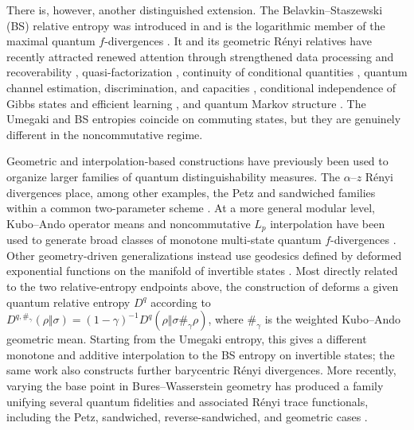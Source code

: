 \documentclass[11pt]{article}
\theoremstyle{remark}
\newcommand{\1}{\mathbbm{1}}
\begin{document}
There is, however, another distinguished extension.  The
Belavkin--Staszewski (BS) relative entropy was introduced in
\cite{BelavkinStaszewski-BSentropy-1982} and is the logarithmic
member of the maximal quantum $f$-divergences
\cite{hiai2017different}.  It and its geometric R\'enyi relatives
have recently attracted renewed attention through strengthened data
processing and recoverability \cite{bluhm2020strengthened},
quasi-factorization
\cite{BluhmCapelPerezHernandez-WeakQFBSentropy-2021}, continuity of
conditional quantities \cite{bluhm2023continuity}, quantum channel
estimation, discrimination, and capacities
\cite{fang2021geometric,katariya2021geometric}, conditional
independence of Gibbs states and efficient learning
\cite{alhambra2026conditional}, and quantum Markov structure
\cite{Bluhm:2025kai}.  The Umegaki and BS
entropies coincide on commuting states, but they are genuinely
different in the noncommutative regime.

Geometric and interpolation-based constructions have previously been
used to organize larger families of quantum distinguishability
measures.  The $\alpha$--$z$ R\'enyi divergences place, among other
examples, the Petz and sandwiched families within a common
two-parameter scheme \cite{audenaert2015alphaz}.  At a more general
modular level, Kubo--Ando operator means and noncommutative $L_p$
interpolation have been used to generate broad classes of monotone
multi-state quantum $f$-divergences \cite{furuya2023monotonic}.
Other geometry-driven generalizations instead use geodesics defined
by deformed exponential functions on the manifold of invertible states
\cite{andrade2020generalized}.
Most directly related to the two relative-entropy endpoints above,
the construction of \cite{mosonyi2024geometric} deforms a given
quantum relative entropy $D^q$ according to
$D^{q,\#_\gamma}(\rho\Vert\sigma)
=(1-\gamma)^{-1}D^q(\rho\Vert\sigma\#_\gamma\rho)$, where
$\#_\gamma$ is the weighted Kubo--Ando geometric mean.  Starting from
the Umegaki entropy, this gives a different monotone and additive
interpolation to the BS entropy on invertible states; the same work also
constructs further barycentric R\'enyi divergences.  More recently,
varying the base point in Bures--Wasserstein geometry has produced a
family unifying several quantum fidelities and associated R\'enyi
trace functionals, including the Petz, sandwiched, reverse-sandwiched,
and geometric cases \cite{afham2025riemannian}.
\end{document}
